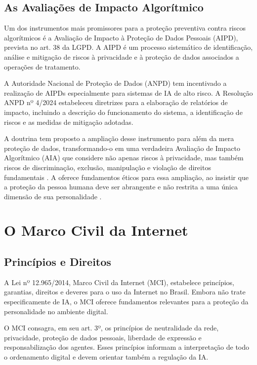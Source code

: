 \subsection{As Avaliações de Impacto Algorítmico}
\label{subsec:avaliacoes-impacto}

Um dos instrumentos mais promissores para a proteção preventiva contra riscos algorítmicos é a Avaliação de Impacto à Proteção de Dados Pessoais (AIPD), prevista no art. 38 da LGPD. A AIPD é um processo sistemático de identificação, análise e mitigação de riscos à privacidade e à proteção de dados associados a operações de tratamento.

A Autoridade Nacional de Proteção de Dados (ANPD) tem incentivado a realização de AIPDs especialmente para sistemas de IA de alto risco. A Resolução ANPD nº 4/2024 estabeleceu diretrizes para a elaboração de relatórios de impacto, incluindo a descrição do funcionamento do sistema, a identificação de riscos e as medidas de mitigação adotadas.

A doutrina tem proposto a ampliação desse instrumento para além da mera proteção de dados, transformando-o em uma verdadeira Avaliação de Impacto Algorítmico (AIA) que considere não apenas riscos à privacidade, mas também riscos de discriminação, exclusão, manipulação e violação de direitos fundamentais \cite{Doneda2022DPD, Edwards2017PC}. A \MH{} oferece fundamentos éticos para essa ampliação, ao insistir que a proteção da pessoa humana deve ser abrangente e não restrita a uma única dimensão de sua personalidade \cite{LeaoXIV2026MH}.

\section{O Marco Civil da Internet}
\label{sec:mci}

\subsection{Princípios e Direitos}
\label{subsec:principios-mci}

A Lei nº 12.965/2014, Marco Civil da Internet (MCI), estabelece princípios, garantias, direitos e deveres para o uso da Internet no Brasil. Embora não trate especificamente de IA, o MCI oferece fundamentos relevantes para a proteção da personalidade no ambiente digital.

O MCI consagra, em seu art. 3º, os princípios de neutralidade da rede, privacidade, proteção de dados pessoais, liberdade de expressão e responsabilização dos agentes. Esses princípios informam a interpretação de todo o ordenamento digital e devem orientar também a regulação da IA.

